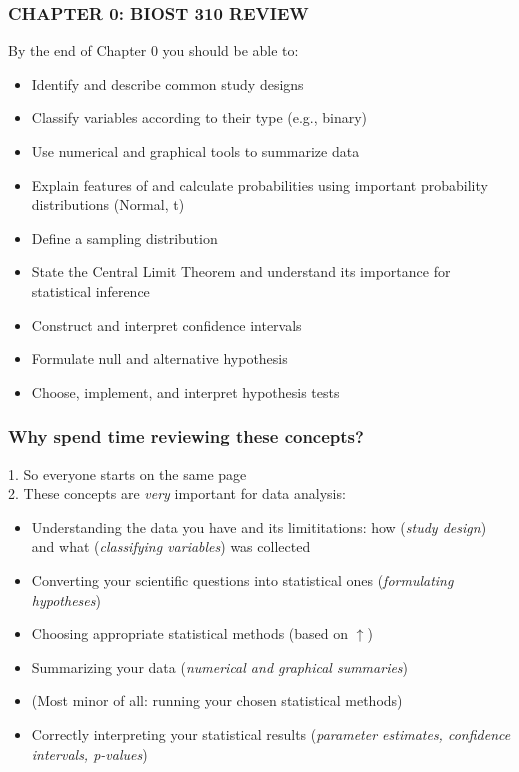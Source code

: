 \documentclass[12pt, 
hyperref={colorlinks=true, linkcolor=blue, urlcolor=cyan}]{beamer}
\begin{document}
\setcounter{framenumber}{\value{chap0}}

\begin{frame} 
\frametitle{CHAPTER 0: BIOST 310 REVIEW}
By the end of Chapter 0 you should be able to: \vspace{-0.2cm}
\begin{itemize}
\item Identify and describe common study designs
\item Classify variables according to their type (e.g., binary)
\item Use numerical and graphical tools to summarize data
\item Explain features of and calculate probabilities using important probability distributions (Normal, t)
\item Define a sampling distribution
\item State the Central Limit Theorem and understand its importance for statistical inference
\item Construct and interpret confidence intervals
\item Formulate null and alternative hypothesis
\item Choose, implement, and interpret hypothesis tests
\end{itemize}
\end{frame}

\begin{frame}
\frametitle{Why spend time reviewing these concepts?} %
1. So everyone starts on the same page \\
2. These concepts are \textit{very} important for data analysis: \vspace{-0.35cm} %
	\begin{itemize} \small \itemsep -0.5pt
	\item Understanding the data you have and its limititations: how (\textit{study design}) and what  (\textit{classifying variables}) was collected
	\item Converting your scientific questions into statistical ones (\textit{formulating hypotheses})
	\item Choosing appropriate statistical methods (based on $\uparrow$) 
	\item Summarizing your data (\textit{numerical and graphical summaries})
	\item \begin{footnotesize} (Most minor of all: running your chosen statistical methods) \end{footnotesize}
	\item Correctly interpreting your statistical results (\textit{parameter estimates, confidence intervals, p-values})
	\end{itemize}
\end{frame}
\end{document}
